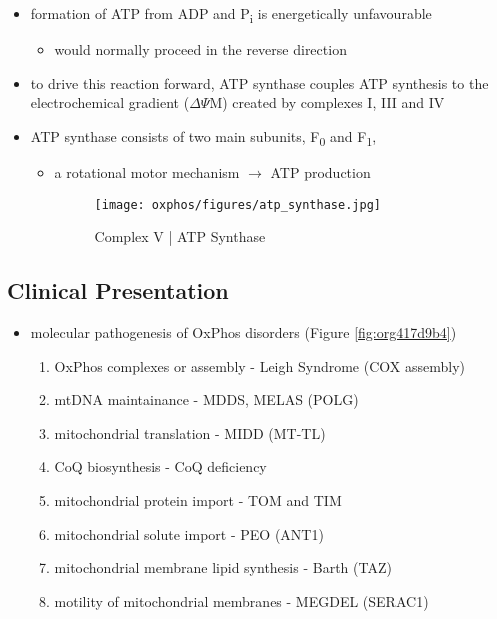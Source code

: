 \documentclass[12pt]{scrartcl}
\begin{document}
{\small{}}

\begin{itemize}
\item formation of ATP from ADP and P\textsubscript{i} is energetically unfavourable
\begin{itemize}
\item would normally proceed in the reverse direction
\end{itemize}

\item to drive this reaction forward, ATP synthase couples ATP synthesis
to the electrochemical gradient (\(\Delta \Psi\)M) created by complexes
I, III and IV
\item ATP synthase consists of two main subunits, F\textsubscript{0} and F\textsubscript{1},
\begin{itemize}
\item a rotational motor mechanism \(\to\) ATP production

\begin{figure}[htbp]
\centering
\texttt{[image: oxphos/figures/atp\_synthase.jpg]}
\caption{\label{fig:orgca63cdb}Complex V | ATP Synthase}
\end{figure}
\end{itemize}
\end{itemize}

\subsection{Clinical Presentation}
\label{sec:org19d608f}
\begin{itemize}
\item molecular pathogenesis of OxPhos disorders (Figure \ref{fig:org417d9b4})
\begin{enumerate}
\item OxPhos complexes or assembly - Leigh Syndrome (COX assembly)
\item mtDNA maintainance - MDDS, MELAS (POLG)
\item mitochondrial translation - MIDD (MT-TL)
\item CoQ biosynthesis - CoQ deficiency
\item mitochondrial protein import - TOM and TIM
\item mitochondrial solute import - PEO (ANT1)
\item mitochondrial membrane lipid synthesis - Barth (TAZ)
\item motility of mitochondrial membranes - MEGDEL (SERAC1)
\end{enumerate}
\end{itemize}
\end{document}
